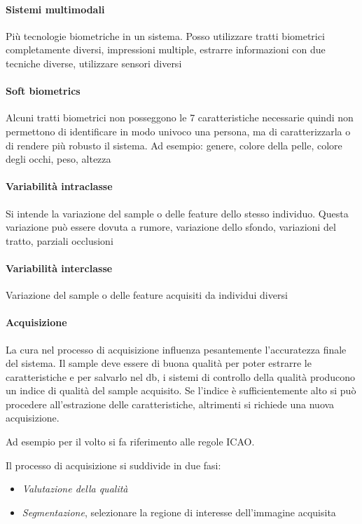 \paragraph{Sistemi multimodali}
Più tecnologie biometriche in un sistema. Posso utilizzare tratti biometrici completamente diversi, impressioni multiple, estrarre informazioni con due tecniche diverse, utilizzare sensori diversi

\paragraph{Soft biometrics}
Alcuni tratti biometrici non posseggono le 7 caratteristiche necessarie quindi non permettono di identificare in modo univoco una persona, ma di caratterizzarla o di rendere più robusto il sistema. Ad esempio: genere, colore della pelle, colore degli occhi, peso, altezza

\paragraph{Variabilità intraclasse}
Si intende la variazione del sample o delle feature dello stesso individuo. Questa variazione può essere dovuta a rumore, variazione dello sfondo, variazioni del tratto, parziali occlusioni

\paragraph{Variabilità interclasse}
Variazione del sample o delle feature acquisiti da individui diversi

\paragraph{Acquisizione}
La cura nel processo di acquisizione influenza pesantemente l’accuratezza finale del sistema. Il sample deve essere di buona qualità per poter estrarre le caratteristiche e per salvarlo nel db, i sistemi di controllo della qualità producono un indice di qualità del sample acquisito. Se l’indice è sufficientemente alto si può procedere all’estrazione delle caratteristiche, altrimenti si richiede una nuova acquisizione.

Ad esempio per il volto si fa riferimento alle regole ICAO.

Il processo di acquisizione si suddivide in due fasi:
\begin{itemize}
    \item \textit{Valutazione della qualità}
    \item \textit{Segmentazione}, selezionare la regione di interesse dell’immagine acquisita
\end{itemize}

